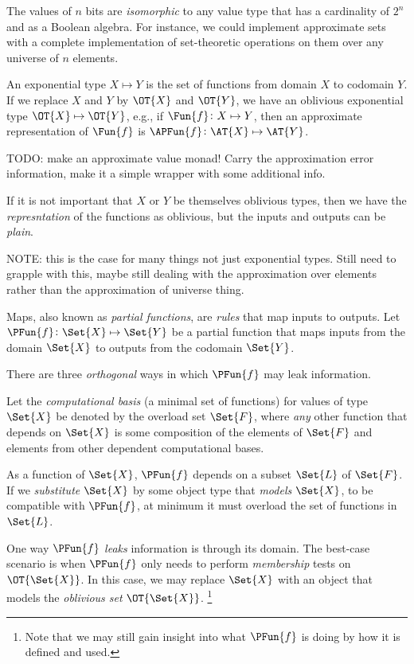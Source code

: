 \documentclass[ ../main.tex]{subfiles}
\begin{document}
The values of $n$ bits are \emph{isomorphic} to any value type that has a cardinality of $2^n$ and as a Boolean algebra.
For instance, we could implement approximate sets with a complete implementation of set-theoretic operations on them over any universe of $n$ elements.
	
An exponential type $X \mapsto Y$ is the set of functions from domain $X$ to codomain $Y$. If we replace $X$ and $Y$ by $\OT{X}$ and $\OT{Y}$, we have an oblivious exponential type $\OT{X} \mapsto \OT{Y}$, e.g., if $\Fun{f} \colon X \mapsto Y$, then an approximate representation of $\Fun{f}$ is $\APFun{f} \colon \AT{X} \mapsto \AT{Y}$.

TODO: make an approximate value monad! Carry the approximation error information, make it a simple wrapper with some additional info.
	
If it is not important that $X$ or $Y$ be themselves oblivious types, then we have the \emph{represntation} of the functions as oblivious, but the inputs and outputs can be \emph{plain}.
	
NOTE: this is the case for many things not just exponential types. Still need to grapple with this, maybe still dealing with the approximation over elements rather than the approximation of universe thing.
	
	
	
	Maps, also known as \emph{partial functions}, are \emph{rules} that map inputs to outputs.
	Let $\PFun{f} \colon \Set{X} \mapsto \Set{Y}$ be a partial function that maps inputs from the domain $\Set{X}$ to outputs from the codomain $\Set{Y}$.
	
	There are three \emph{orthogonal} ways in which $\PFun{f}$ may leak information.
	
	Let the \emph{computational basis} (a minimal set of functions) for values of type $\Set{X}$ be denoted by the overload set $\Set{F}$, where \emph{any} other function that depends on $\Set{X}$ is some composition of the elements of $\Set{F}$ and elements from other dependent computational bases.
	
	As a function of $\Set{X}$, $\PFun{f}$ depends on a subset $\Set{L}$ of $\Set{F}$.
	If we \emph{substitute} $\Set{X}$ by some object type that \emph{models} $\Set{X}$, to be compatible with $\PFun{f}$, at minimum it must overload the set of functions in $\Set{L}$.
	
	One way $\PFun{f}$ \emph{leaks} information is through its domain.
	The best-case scenario is when $\PFun{f}$ only needs to perform \emph{membership} tests on $\OT{\Set{X}}$.
	In this case, we may replace $\Set{X}$ with an object that models the \emph{oblivious set} $\OT{\Set{X}}$.
	\footnote{Note that we may still gain insight into what $\PFun{f}$ is doing by how it is defined and used.}
	
\end{document}
